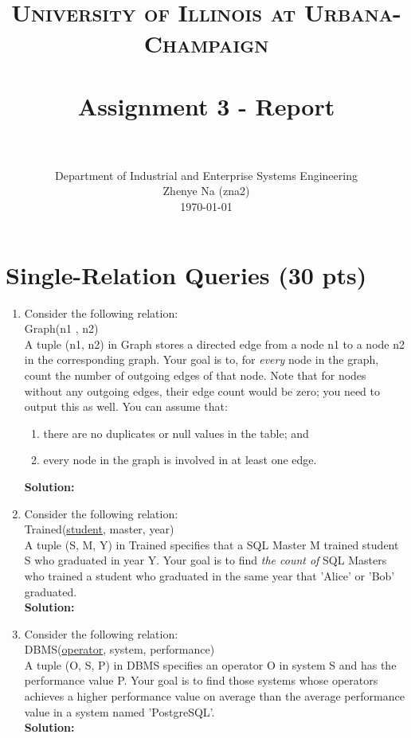 \documentclass[paper=a4, fontsize=11pt]{scrartcl}
\title{
		\usefont{OT1}{bch}{b}{n}
		\normalfont \normalsize \textsc{University of Illinois at Urbana-Champaign} \\ [25pt]
		\horrule{0.5pt} \\[0.4cm]
		\huge Assignment 3 - Report \\
		\horrule{2pt} \\[0.5cm]
}
\author{
		\normalfont 								\normalsize
        Department of Industrial and Enterprise Systems Engineering\\
        \normalsize Zhenye Na (zna2)\\[-3pt]		\normalsize
        \today
}
\date{}
\numberwithin{equation}{section}		%
\numberwithin{figure}{section}			%
\numberwithin{table}{section}				%
\begin{document}
\maketitle

\section{Single-Relation Queries (30 pts)}

\begin{enumerate}
	\item Consider the following relation:\\
    Graph(n1 , n2)\\
	A tuple (n1, n2) in Graph stores a directed edge from a node n1 to a node n2 in the corresponding graph. Your goal is to, for \textit{every} node in the graph, count the number of outgoing edges of that node. Note that for nodes without any outgoing edges, their edge count would be zero; you need to output this as well.
You can assume that:
\begin{enumerate}
\item there are no duplicates or null values in the table; and
\item every node in the graph is involved in at least one edge.
\end{enumerate}

\textbf{Solution: }
    
	\item Consider the following relation:\\
    Trained(\underline{student}, master, year)\\
    A tuple (S, M, Y) in Trained specifies that a SQL Master M trained student S who graduated in year Y. Your goal is to find \textit{the count of} SQL Masters who trained a student who graduated in the same year that 'Alice' or 'Bob' graduated.\\
    \textbf{Solution: }



	\item Consider the following relation:\\
    DBMS(\underline{operator}, system, performance)\\
    A tuple (O, S, P) in DBMS specifies an operator O in system S and has the performance value P. Your goal is to find those systems whose operators achieves a higher performance value on average than the average performance value in a system named 'PostgreSQL'.\\
    \textbf{Solution: }
    
\end{enumerate}
\end{document}

